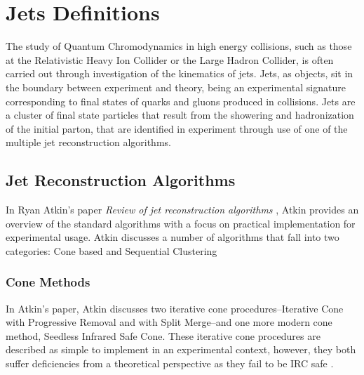 %
\section{Jets Definitions}
The study of Quantum Chromodynamics in high energy collisions, such as those at the Relativistic Heavy Ion Collider or the Large Hadron Collider, is often carried out through investigation of the kinematics of jets.
Jets, as objects, sit in the boundary between experiment and theory, being an experimental signature corresponding to final states of quarks and gluons produced in collisions. 
Jets are a cluster of final state particles that result from the showering and hadronization of the initial parton, that are identified in experiment through use of one of the multiple jet reconstruction algorithms. 
\subsection{Jet Reconstruction Algorithms}
In Ryan Atkin's paper \textit{Review of jet reconstruction algorithms} \cite{Atkin2015}, Atkin provides an overview of the standard algorithms with a focus on practical implementation for experimental usage. %
Atkin discusses a number of algorithms that fall into two categories: Cone based and Sequential Clustering 
\subsubsection{Cone Methods}
	In Atkin's paper, Atkin discusses two iterative cone procedures--Iterative Cone with Progressive Removal and with Split Merge--and one more modern cone method, Seedless Infrared Safe Cone. 
	These iterative cone procedures are described as simple to implement in an experimental context, however, they both suffer deficiencies from a theoretical perspective as they fail to be IRC safe \cite{Atkin2015} \cite{Salam2007}.

